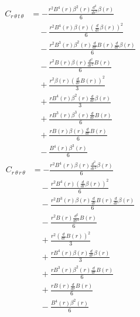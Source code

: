 \documentclass[11pt,a4paper]{article}
\begin{document}
\begin{align*}
  C_{r\,\theta\,t\,\theta} &= - \frac{r^{2} B^{4}{\left(r \right)} \beta^{2}{\left(r \right)} \frac{d^{2}}{d r^{2}} \beta{\left(r \right)}}{6} \\
  &\quad - \frac{r^{2} B^{4}{\left(r \right)} \beta{\left(r \right)} \left(\frac{d}{d r} \beta{\left(r \right)}\right)^{2}}{6} \\
  &\quad - \frac{r^{2} B^{3}{\left(r \right)} \beta^{2}{\left(r \right)} \frac{d}{d r} B{\left(r \right)} \frac{d}{d r} \beta{\left(r \right)}}{6} \\
  &\quad - \frac{r^{2} B{\left(r \right)} \beta{\left(r \right)} \frac{d^{2}}{d r^{2}} B{\left(r \right)}}{6} \\
  &\quad + \frac{r^{2} \beta{\left(r \right)} \left(\frac{d}{d r} B{\left(r \right)}\right)^{2}}{3} \\
  &\quad + \frac{r B^{4}{\left(r \right)} \beta^{2}{\left(r \right)} \frac{d}{d r} \beta{\left(r \right)}}{3} \\
  &\quad + \frac{r B^{3}{\left(r \right)} \beta^{3}{\left(r \right)} \frac{d}{d r} B{\left(r \right)}}{6} \\
  &\quad + \frac{r B{\left(r \right)} \beta{\left(r \right)} \frac{d}{d r} B{\left(r \right)}}{6} \\
  &\quad - \frac{B^{4}{\left(r \right)} \beta^{3}{\left(r \right)}}{6}
\end{align*}
\begin{align*}
  C_{r\,\theta\,r\,\theta} &= - \frac{r^{2} B^{4}{\left(r \right)} \beta{\left(r \right)} \frac{d^{2}}{d r^{2}} \beta{\left(r \right)}}{6} \\
  &\quad - \frac{r^{2} B^{4}{\left(r \right)} \left(\frac{d}{d r} \beta{\left(r \right)}\right)^{2}}{6} \\
  &\quad - \frac{r^{2} B^{3}{\left(r \right)} \beta{\left(r \right)} \frac{d}{d r} B{\left(r \right)} \frac{d}{d r} \beta{\left(r \right)}}{6} \\
  &\quad - \frac{r^{2} B{\left(r \right)} \frac{d^{2}}{d r^{2}} B{\left(r \right)}}{6} \\
  &\quad + \frac{r^{2} \left(\frac{d}{d r} B{\left(r \right)}\right)^{2}}{3} \\
  &\quad + \frac{r B^{4}{\left(r \right)} \beta{\left(r \right)} \frac{d}{d r} \beta{\left(r \right)}}{3} \\
  &\quad + \frac{r B^{3}{\left(r \right)} \beta^{2}{\left(r \right)} \frac{d}{d r} B{\left(r \right)}}{6} \\
  &\quad + \frac{r B{\left(r \right)} \frac{d}{d r} B{\left(r \right)}}{6} \\
  &\quad - \frac{B^{4}{\left(r \right)} \beta^{2}{\left(r \right)}}{6}
\end{align*}
\end{document}
